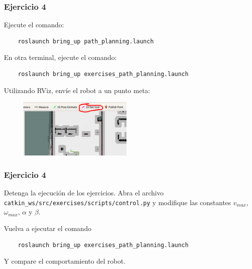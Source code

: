 \begin{frame}[containsverbatim]\frametitle{Ejercicio 4}
  Ejecute el comando:
  \begin{lstlisting}
    roslaunch bring_up path_planning.launch
  \end{lstlisting}
  En otra terminal, ejecute el comando:
  \begin{lstlisting}
    roslaunch bring_up exercises_path_planning.launch
  \end{lstlisting}
  Utilizando RViz, envíe el robot a un punto meta:
  \begin{figure}
    \centering
    \includegraphics[width=0.5\textwidth]{Figures/Exercise4Rviz.png}
  \end{figure}
\end{frame}

\begin{frame}[containsverbatim]\frametitle{Ejercicio 4}
  Detenga la ejecución de los ejercicios. Abra el archivo \texttt{catkin\_ws/src/exercises/scripts/control.py} y modifique las constantes $v_{max}$, $\omega_{max}$, $\alpha$ y $\beta$.
  
  Vuelva a ejecutar el comando
  \begin{lstlisting}
    roslaunch bring_up exercises_path_planning.launch
  \end{lstlisting}
  Y compare el comportamiento del robot.
\end{frame}
